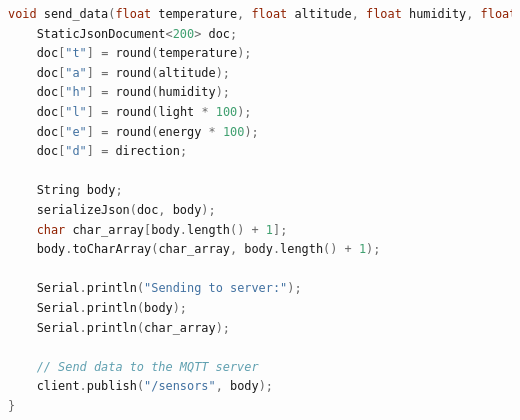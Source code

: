 \begin{lstlisting}[style=mystyle,language=C,caption={Snippet of our \texttt{send\_data} function which serializes our sensor data into JSON and sends it over the MQTT broker.}]
void send_data(float temperature, float altitude, float humidity, float light, float energy, String direction) {
    StaticJsonDocument<200> doc;
    doc["t"] = round(temperature);
    doc["a"] = round(altitude);
    doc["h"] = round(humidity);
    doc["l"] = round(light * 100);
    doc["e"] = round(energy * 100);
    doc["d"] = direction;

    String body;
    serializeJson(doc, body);
    char char_array[body.length() + 1];
    body.toCharArray(char_array, body.length() + 1);

    Serial.println("Sending to server:");
    Serial.println(body);
    Serial.println(char_array);

    // Send data to the MQTT server
    client.publish("/sensors", body);
}
\end{lstlisting}